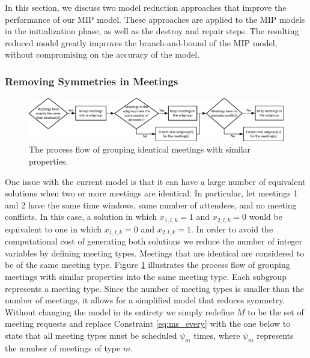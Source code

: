 In this section, we discuss two model reduction approaches that improve the performance of our MIP model. These approaches are applied to the MIP models in the initialization phase, as well as the destroy and repair steps. The resulting reduced model greatly improves the branch-and-bound of the MIP model, without compromising on the accuracy of the model.


\subsubsection{Removing Symmetries in Meetings}

\begin{figure}[b]
	\centering
		\includegraphics[width=1\linewidth]{figs/lns_mtype.jpg}
	\caption{The process flow of grouping identical meetings with similar properties.}
	\label{fig:mtype}
\end{figure}

One issue with the current model is that it can have a large number of equivalent solutions when two or more meetings are identical. In particular, let meetings 1 and 2 have the same time windows, same number of attendees, and no meeting conflicts. In this case, a solution in which $x_{1,l,k} = 1$ and $x_{2,l,k} = 0$ would be equivalent to one in which $x_{1,l,k} = 0$ and $x_{2,l,k} = 1$. In order to avoid the computational cost of generating both solutions we reduce the number of integer variables by defining meeting types. Meetings that are identical are considered to be of the same meeting type. Figure \ref{fig:mtype} illustrates the process flow of grouping meetings with similar properties into the same meeting type. Each subgroup represents a meeting type. Since the number of meeting types is smaller than the number of meetings, it allows for a simplified model that reduces symmetry. Without changing the model in its entirety we simply redefine $M$ to be the set of meeting requests and replace Constraint \eqref{eq:ms_every} with the one below to state that all meeting types must be scheduled $\psi_m$ times, where $\psi_m$ represents the number of meetings of type $m$.

